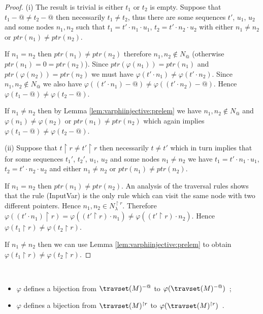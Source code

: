 \begin{proof}

(i) The result is trivial is either $t_1$ or $t_2$ is empty.
Suppose that $t_1-@\neq t_2-@$ then necessarily $t_1 \neq t_2$, thus there are some sequences $t'$, $u_1$, $u_2$ and some nodes $n_1,n_2$ such that
 $t_1 = t' \cdot n_1 \cdot u_1$, $t_2 = t' \cdot n_2 \cdot u_2$ with either $n_1\neq n_2$ or $ptr(n_1) \neq ptr(n_2)$.

If $n_1 = n_2$ then $ptr(n_1) \neq ptr(n_2)$ therefore $n_1,n_2 \not\in N_@$ (otherwise $ptr(n_1) = 0 = ptr(n_2)$). Since $ptr(\varphi(n_1)) = ptr(n_1)$ and  $ptr(\varphi(n_2)) = ptr(n_2)$ we must have $\varphi(t' \cdot n_1) \neq \varphi(t' \cdot n_2)$. Since $n_1,n_2 \not\in N_@$ we also have $\varphi((t' \cdot n_1)-@) \neq \varphi((t' \cdot n_2)-@)$. Hence $\varphi(t_1-@) \neq \varphi(t_2-@)$.

If $n_1 \neq n_2$ then by Lemma \ref{lem:varphiinjective:prelem} we have $n_1,n_2 \not\in N_@$ and $\varphi(n_1) \neq \varphi(n_2)$ or $ptr(n_1) \neq ptr(n_2)$ which again implies $\varphi(t_1-@) \neq \varphi(t_2-@)$.


(ii) Suppose that $t \upharpoonright r \neq t' \upharpoonright r$ then necessarily $t \neq t'$ which in turn implies that for some sequences $t_1'$, $t_2'$, $u_1$, $u_2$ and some nodes $n_1 \neq n_2$
we have $t_1 = t' \cdot n_1 \cdot u_1$, $t_2 = t' \cdot n_2 \cdot u_2$ and either $n_1\neq n_2$ or $ptr(n_1) \neq ptr(n_2)$.

If $n_1 = n_2$ then $ptr(n_1) \neq ptr(n_2)$. An   analysis of the traversal rules shows that the rule (InputVar) is the only rule which can visit the same node with two different pointers. Hence $n_1,n_2 \in N_\lambda^{\upharpoonright r}$.
Therefore $\varphi( (t'\cdot n_1) \upharpoonright r ) = \varphi( (t'\upharpoonright r) \cdot n_1 )  \neq \varphi( (t'\upharpoonright r) \cdot n_2 )$. Hence    $\varphi( t_1\upharpoonright r ) \neq \varphi( t_2\upharpoonright r )$.

If $n_1 \neq n_2$ then we can use Lemma \ref{lem:varphiinjective:prelem}
to obtain $\varphi( t_1\upharpoonright r ) \neq \varphi( t_2\upharpoonright r )$.
\end{proof}

\begin{corollary} \
\label{cor:varphi_bij}
\begin{itemize}
\item[(i)] $\varphi$ defines a bijection from $\travset(M)^{-@}$
to $\varphi(\travset(M)^{-@})$\ ;
\item[(ii)] $\varphi$ defines a bijection from $\travset(M)^{\upharpoonright r}$ to
$\varphi(\travset(M)^{\upharpoonright r})$\ .
\end{itemize}
\end{corollary}

